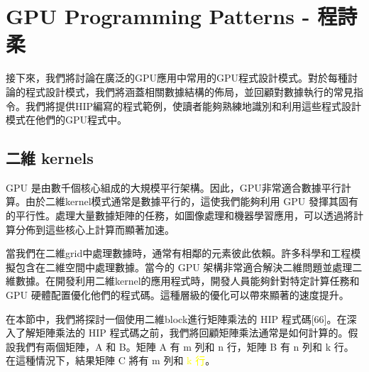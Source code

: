 \usepackage{listings}
\usepackage{xcolor}
\chapter{GPU Programming Patterns - 程詩柔} \label{chap:GPU_programming_patterns}
接下來，我們將討論在廣泛的GPU應用中常用的GPU程式設計模式。對於每種討論的程式設計模式，我們將涵蓋相關數據結構的佈局，並回顧對數據執行的常見指令。我們將提供HIP編寫的程式範例，使讀者能夠熟練地識別和利用這些程式設計模式在他們的GPU程式中。
\section{二維 kernels}
GPU 是由數千個核心組成的大規模平行架構。因此，GPU非常適合數據平行計算。由於二維kernel模式通常是數據平行的，這使我們能夠利用 GPU 發揮其固有的平行性。處理大量數據矩陣的任務，如圖像處理和機器學習應用，可以透過將計算分佈到這些核心上計算而顯著加速。

\vspace{1em}
當我們在二維grid中處理數據時，通常有相鄰的元素彼此依賴。許多科學和工程模擬包含在二維空間中處理數據。當今的 GPU 架構非常適合解決二維問題並處理二維數據。在開發利用二維kernel的應用程式時，開發人員能夠針對特定計算任務和 GPU 硬體配置優化他們的程式碼。這種層級的優化可以帶來顯著的速度提升。

\vspace{1em}
在本節中，我們將探討一個使用二維block進行矩陣乘法的 HIP 程式碼[66]。在深入了解矩陣乘法的 HIP 程式碼之前，我們將回顧矩陣乘法通常是如何計算的。假設我們有兩個矩陣，A 和 B。矩陣 A 有 m 列和 n 行，矩陣 B 有 n 列和 k 行。在這種情況下，結果矩陣 C 將有 m 列和 \textcolor{yellow}{k 行}。


